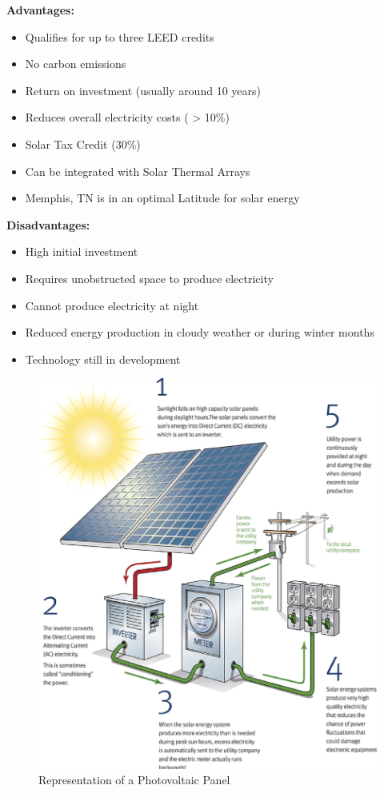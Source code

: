 \documentclass{ceri}
\begin{document}
\textbf{Advantages:}
\begin{itemize}
\item Qualifies for up to three LEED credits
\item No carbon emissions
\item Return on investment (usually around 10 years)
\item Reduces overall electricity costs ( > 10\%)
\item Solar Tax Credit (30\%)
\item Can be integrated with Solar Thermal Arrays
\item Memphis, TN is in an optimal Latitude for solar energy
\end{itemize}
\textbf{Disadvantages:}
\begin{itemize}
\item High initial investment
\item Requires unobstructed space to produce electricity
\item Cannot produce electricity at night
\item Reduced energy production in cloudy weather or during winter months
\item Technology still in development
\end{itemize}

\begin{figure}[H]
    \centering
    \includegraphics[width=.8\textwidth]{images/LEED1.png}
    \caption{Representation of a Photovoltaic Panel}
    \label{fig:PP_LEED}
\end{figure}
\newpage
\end{document}
